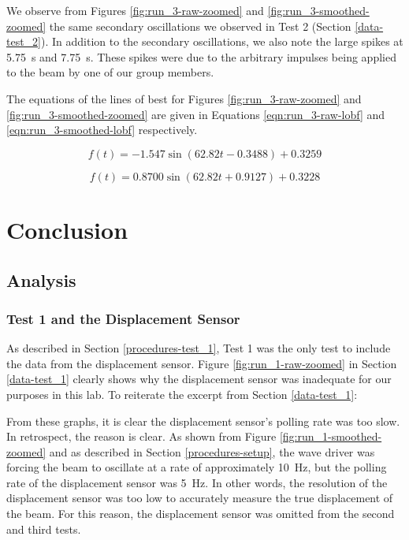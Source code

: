 \documentclass[12 pt]{report}
\begin{document}
We observe from Figures \ref{fig:run_3-raw-zoomed} and \ref{fig:run_3-smoothed-zoomed} the same secondary oscillations we observed in Test \num{2} (Section \ref{data-test_2}). In addition to the secondary oscillations, we also note the large spikes at \qty{5.75}{\s} and \qty{7.75}{\s}. These spikes were due to the arbitrary impulses being applied to the beam by one of our group members.

The equations of the lines of best for Figures \ref{fig:run_3-raw-zoomed} and \ref{fig:run_3-smoothed-zoomed} are given in Equations \ref{eqn:run_3-raw-lobf} and \ref{eqn:run_3-smoothed-lobf} respectively.

\begin{equation} \label{eqn:run_3-raw-lobf}
f(t)=-1.547\sin(62.82t-0.3488)+0.3259
\end{equation}

\begin{equation} \label{eqn:run_3-smoothed-lobf}
f(t)=0.8700\sin(62.82t+0.9127)+0.3228
\end{equation}

\chapter{Conclusion} \label{conclusion-chapter}
\section{Analysis} \label{analysis}
\subsection{Test 1 and the Displacement Sensor} \label{analysis-test_1_and_the_displacement_sensor}
As described in Section \ref{procedures-test_1}, Test \num{1} was the only test to include the data from the displacement sensor. Figure \ref{fig:run_1-raw-zoomed} in Section \ref{data-test_1} clearly shows why the displacement sensor was inadequate for our purposes in this lab. To reiterate the excerpt from Section \ref{data-test_1}:

\begin{displayquote}
From these graphs, it is clear the displacement sensor's polling rate was too slow. In retrospect, the reason is clear. As shown from Figure \ref{fig:run_1-smoothed-zoomed} and as described in Section \ref{procedures-setup}, the wave driver was forcing the beam to oscillate at a rate of approximately \qty{10}{\hertz}, but the polling rate of the displacement sensor was \qty{5}{\hertz}. In other words, the resolution of the displacement sensor was too low to accurately measure the true displacement of the beam. For this reason, the displacement sensor was omitted from the second and third tests.
\end{displayquote}
\end{document}
